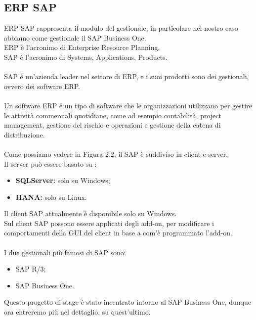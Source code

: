 \subsection{ERP SAP}
\vspace{1em}
ERP SAP rappresenta il modulo del gestionale, in particolare nel nostro caso abbiamo come gestionale il SAP Business One.\\
ERP è l'acronimo di Enterprise Resource Planning.\\SAP è l'acronimo di Systems, Applications, Products.\\\\
SAP è un'azienda leader nel settore di ERP, e i suoi prodotti sono dei gestionali, ovvero dei software ERP.\\\\
Un software ERP è un tipo di software che le organizzazioni utilizzano per gestire le attività commerciali quotidiane, come ad esempio contabilità, project management, gestione del rischio e operazioni e gestione della catena di distribuzione.\\\\
Come possiamo vedere in Figura 2.2, il SAP è suddiviso in client e server.\\
Il server può essere basato su :
\begin{itemize}
	\item \textbf{SQLServer:} solo su Windows;
	\item \textbf{HANA:} solo su Linux.
\end{itemize}
Il client SAP attualmente è disponibile solo su Windows.\\Sul client SAP possono essere applicati degli add-on, per modificare i comportamenti della GUI del client in base a com'è programmato l'add-on.\\\\
I due gestionali più famosi di SAP sono:
\begin{itemize}
	\item SAP R/3;
	\item SAP Business One.
\end{itemize}
Questo progetto di stage è stato incentrato intorno al SAP Business One, dunque ora entreremo più nel dettaglio, su quest'ultimo.
\newpage
